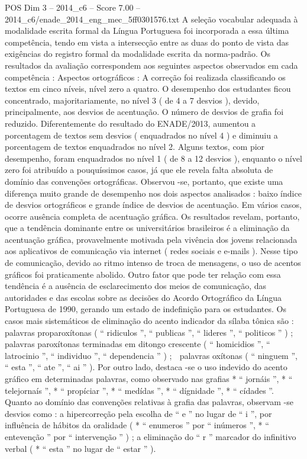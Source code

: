 \begin{textsample}{POS Dim 3 – 2014\_c6 – Score 7.00 – 2014\_c6/enade\_2014\_eng\_mec\_5ff0301576.txt}
A seleção vocabular adequada à modalidade escrita formal da Língua Portuguesa foi incorporada a essa última competência, tendo em vista a intersecção entre as duas do ponto de vista das exigências do registro formal da modalidade escrita da norma-padrão.
Os resultados da avaliação correspondem aos seguintes aspectos observados em cada competência : Aspectos ortográficos : A correção foi realizada classificando os textos em cinco níveis, nível zero a quatro.
O desempenho dos estudantes ficou concentrado, majoritariamente, no nível 3 ( de 4 a 7 desvios ), devido, principalmente, aos desvios de acentuação.
O número de desvios de grafia foi reduzido.
Diferentemente do resultado do ENADE/2013, aumentou a porcentagem de textos sem desvios ( enquadrados no nível 4 ) e diminuiu a porcentagem de textos enquadrados no nível 2.
Alguns textos, com pior desempenho, foram enquadrados no nível 1 ( de 8 a 12 desvios ), enquanto o nível zero foi atribuído a pouquíssimos casos, já que ele revela falta absoluta de domínio das convenções ortográficas.
Observou -se, portanto, que existe uma diferença muito grande de desempenho nos dois aspectos analisados : baixo índice de desvios ortográficos e grande índice de desvios de acentuação.
Em vários casos, ocorre ausência completa de acentuação gráfica.
Os resultados revelam, portanto, que a tendência dominante entre os universitários brasileiros é a eliminação da acentuação gráfica, provavelmente motivada pela vivência dos jovens relacionada aos aplicativos de comunicação via internet ( redes sociais e e-mails ).
Nesse tipo de comunicação, devido ao ritmo intenso de troca de mensagens, o uso de acentos gráficos foi praticamente abolido.
Outro fator que pode ter relação com essa tendência é a ausência de esclarecimento dos meios de comunicação, das autoridades e das escolas sobre as decisões do Acordo Ortográfico da Língua Portuguesa de 1990, gerando um estado de indefinição para os estudantes.
Os casos mais sistemáticos de eliminação do acento indicador da sílaba tônica são :  palavras proparoxítonas ( “ ridiculos ”, “ publicas ”, “ lideres ”, “ politicos ” ) ;  palavras paroxítonas terminadas em ditongo crescente ( “ homicidios ”, “ latrocinio ”, “ individuo ”, “ dependencia ” ) ;  palavras oxítonas ( “ ninguem ”, “ esta ”, “ ate ”, “ ai ” ).
Por outro lado, destaca -se o uso indevido do acento gráfico em determinadas palavras, como observado nas grafias * “ jornáis ”, * “ telejornaís ”, * “ propíciar ”, * “ medídas ”, * “ dígnidade ”, * “ cídades ”.
Quanto ao domínio das convenções relativas à grafia das palavras, observam -se desvios como : a hipercorreção pela escolha de “ e ” no lugar de “ i ”, por influência de hábitos da oralidade ( * “ enumeros ” por “ inúmeros ”, * “ entevenção ” por “ intervenção ” ) ; a eliminação do “ r ” marcador do infinitivo verbal ( * “ esta ” no lugar de “ estar ” ).

\end{textsample}
